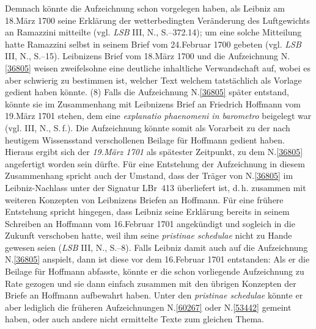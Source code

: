 Demnach könnte die Aufzeichnung schon vorgelegen haben, als Leibniz am 18.\;März 1700 seine Erklärung der wetterbedingten Veränderung des Luftgewichts an Ramazzini mitteilte (vgl. \textit{LSB} III, N., S.--372.14);\cite{01454}
um eine solche Mitteilung hatte Ramazzini selbst in seinem Brief vom 24.\;Februar 1700 gebeten (vgl. \textit{LSB} III, N., S.--15).\cite{01453}
Leibnizens Brief vom 18.\;März 1700\cite{01454} und die Aufzeichnung N.\;\ref{36805} weisen zweifelsohne eine deutliche inhaltliche Verwandschaft auf, wobei es aber schwierig zu bestimmen ist, welcher Text welchem tatstächlich als Vorlage gedient haben könnte.
\pend%
\pstart%
(8)
Falls die Aufzeichnung N.\;\ref{36805} später entstand, könnte sie im Zusammenhang mit Leibnizens Brief an Friedrich Hoffmann vom 19.\;März 1701 stehen, dem eine \textit{explanatio phaenomeni in barometro} beigelegt war (vgl. III, N., S.\,f.).\cite{01456}
Die Aufzeichnung könnte somit als Vorarbeit zu der nach heutigem Wissensstand verschollenen Beilage für Hoffmann gedient haben.
Hieraus ergibt sich der \textit{19.\;März 1701} als spätester Zeitpunkt, zu dem N.\;\ref{36805} angefertigt worden sein dürfte.
Für eine Entstehung der Aufzeichnung in diesem Zusammenhang spricht auch der Umstand, dass der Träger von N.\;\ref{36805} im Leibniz-Nachlass unter der Signatur LBr~413 überliefert ist, d.\,h. zusammen mit weiteren Konzepten von Leibnizens Briefen an Hoffmann.
Für eine frühere Entstehung spricht hingegen, dass Leibniz seine Erklärung bereits in seinem Schreiben an Hoffmann vom 16.\;Februar 1701 angekündigt und sogleich in die Zukunft verschoben hatte, weil ihm seine \textit{pristinae schedulae} nicht zu Hande gewesen seien (\textit{LSB} III, N., S.--8).\cite{01455}
Falls Leibniz damit auch auf die Aufzeichnung N.\;\ref{36805} anspielt, dann ist diese vor dem 16.\;Februar 1701 entstanden:
Als er die Beilage für Hoffmann abfasste, könnte er die schon vorliegende Aufzeichnung zu Rate gezogen und sie dann einfach zusammen mit den übrigen Konzepten der Briefe an Hoffmann aufbewahrt haben.
Unter den \textit{pristinae schedulae} könnte er aber lediglich die früheren Aufzeichnungen N.\;\ref{60267} oder N.\;\ref{53442} gemeint haben, oder auch andere nicht ermittelte Texte zum gleichen Thema.
